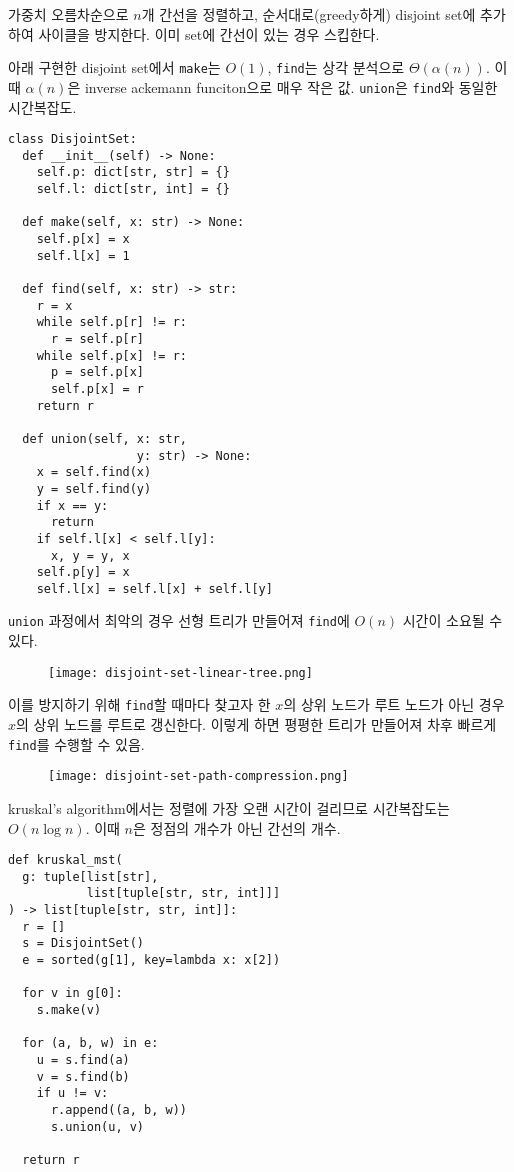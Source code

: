 가중치 오름차순으로 $n$개 간선을 정렬하고, 순서대로(greedy하게) disjoint set에 추가하여 사이클을 방지한다. 이미 set에 간선이 있는 경우 스킵한다.

아래 구현한 disjoint set에서 \texttt{make}는 $O(1)$, \texttt{find}는 상각 분석으로 $\Theta(\alpha(n))$. 이때 $\alpha(n)$은 inverse ackemann funciton으로 매우 작은 값. \texttt{union}은 \texttt{find}와 동일한 시간복잡도.

\begin{verbatim}
class DisjointSet:
  def __init__(self) -> None:
    self.p: dict[str, str] = {}
    self.l: dict[str, int] = {}

  def make(self, x: str) -> None:
    self.p[x] = x
    self.l[x] = 1

  def find(self, x: str) -> str:
    r = x
    while self.p[r] != r:
      r = self.p[r]
    while self.p[x] != r:
      p = self.p[x]
      self.p[x] = r
    return r

  def union(self, x: str,
                  y: str) -> None:
    x = self.find(x)
    y = self.find(y)
    if x == y:
      return
    if self.l[x] < self.l[y]:
      x, y = y, x
    self.p[y] = x
    self.l[x] = self.l[x] + self.l[y]
\end{verbatim}

\texttt{union} 과정에서 최악의 경우 선형 트리가 만들어져 \texttt{find}에 $O(n)$ 시간이 소요될 수 있다.

\begin{figure}[h]
  \centering
  \texttt{[image: disjoint-set-linear-tree.png]}
\end{figure}

이를 방지하기 위해 \texttt{find}할 때마다 찾고자 한 $x$의 상위 노드가 루트 노드가 아닌 경우 $x$의 상위 노드를 루트로 갱신한다. 이렇게 하면 평평한 트리가 만들어져 차후 빠르게 \texttt{find}를 수행할 수 있음.

\begin{figure}[h]
  \centering
  \texttt{[image: disjoint-set-path-compression.png]}
\end{figure}

kruskal's algorithm에서는 정렬에 가장 오랜 시간이 걸리므로 시간복잡도는 $O(n \log{n})$. 이때 $n$은 정점의 개수가 아닌 간선의 개수.

\begin{verbatim}
def kruskal_mst(
  g: tuple[list[str],
           list[tuple[str, str, int]]]
) -> list[tuple[str, str, int]]:
  r = []
  s = DisjointSet()
  e = sorted(g[1], key=lambda x: x[2])

  for v in g[0]:
    s.make(v)

  for (a, b, w) in e:
    u = s.find(a)
    v = s.find(b)
    if u != v:
      r.append((a, b, w))
      s.union(u, v)

  return r
\end{verbatim}

